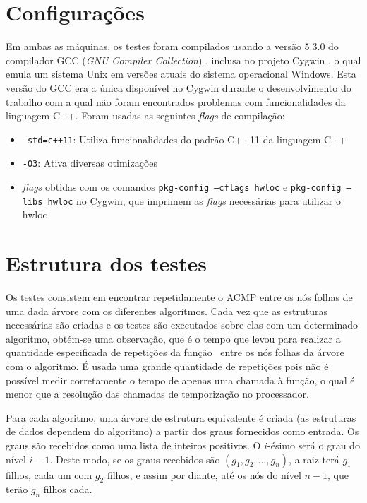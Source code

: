 \section{Configurações}

Em ambas as máquinas, os testes foram compilados usando a versão 5.3.0 do compilador GCC (\textit{GNU Compiler Collection}) \cite{gcc}, inclusa no projeto Cygwin \cite{cygwin}, o qual emula um sistema Unix em versões atuais do sistema operacional Windows.
Esta versão do GCC era a única disponível no Cygwin durante o desenvolvimento do trabalho com a qual não foram encontrados problemas com funcionalidades da linguagem C++.
Foram usadas as seguintes \textit{flags} de compilação:
\begin{itemize}
	\item \texttt{-std=c++11}: Utiliza funcionalidades do padrão C++11 da linguagem C++
	\item \texttt{-O3}: Ativa diversas otimizações
	\item \textit{flags} obtidas com os comandos \texttt{pkg-config --cflags hwloc} e \texttt{pkg-config --libs hwloc} no Cygwin, que imprimem as \textit{flags} necessárias para utilizar o hwloc
\end{itemize}
%


\section{Estrutura dos testes}

Os testes consistem em encontrar repetidamente o ACMP entre os nós folhas de uma dada árvore com os diferentes algoritmos.
Cada vez que as estruturas necessárias são criadas e os testes são executados sobre elas com um determinado algoritmo, obtém-se uma observação, que é o tempo que levou para realizar a quantidade especificada de repetições da função \fACMP\ entre os nós folhas da árvore com o algoritmo.
É usada uma grande quantidade de repetições pois não é possível medir corretamente o tempo de apenas uma chamada à função, o qual é menor que a resolução das chamadas de temporização no processador.

Para cada algoritmo, uma árvore de estrutura equivalente é criada (as estruturas de dados dependem do algoritmo) a partir dos graus fornecidos como entrada.
Os graus são recebidos como uma lista de inteiros positivos.
O $i$-ésimo será o grau do nível $i-1$.
Deste modo, se os graus recebidos são $(g_1, g_2, ..., g_n)$, a raiz terá $g_1$ filhos, cada um com $g_2$ filhos, e assim por diante, até os nós do nível $n-1$, que terão $g_n$ filhos cada.

